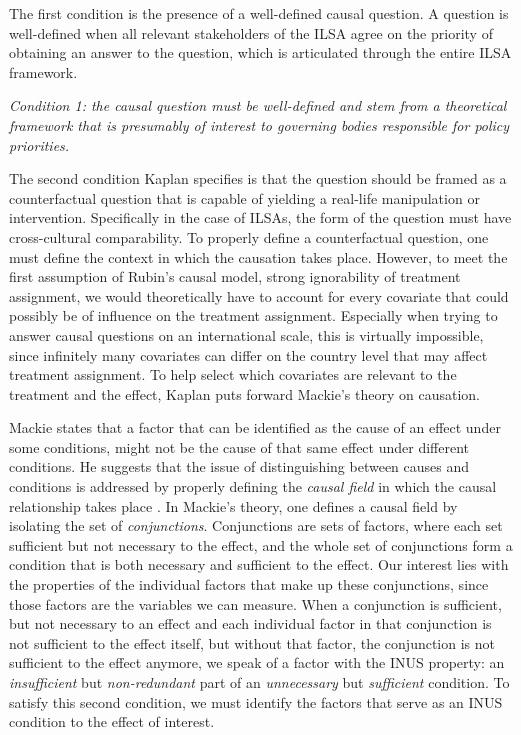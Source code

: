 The first condition is the presence of a well-defined causal question. A question is well-defined when all relevant stakeholders of the ILSA agree on the priority of obtaining an answer to the question, which is articulated through the entire ILSA framework.\newline

\textit{Condition 1: the causal question must be well-defined and stem from a theoretical framework that is presumably of interest to governing bodies responsible for policy priorities.}  \newline

The second condition Kaplan specifies is that the question should be framed as a counterfactual question that is capable of yielding a real-life manipulation or intervention. Specifically in the case of ILSAs, the form of the question must have cross-cultural comparability. To properly define a counterfactual question, one must define the context in which the causation takes place. However, to meet the first assumption of Rubin's causal model, strong ignorability of treatment assignment, we would theoretically have to account for every covariate that could possibly be of influence on the treatment assignment. Especially when trying to answer causal questions on an international scale, this is virtually impossible, since infinitely many covariates can differ on the country level that may affect treatment assignment. To help select which covariates are relevant to the treatment and the effect, Kaplan puts forward Mackie's theory on causation. \newline

Mackie states that a factor that can be identified as the cause of an effect under some conditions, might not be the cause of that same effect under different conditions. He suggests that the issue of distinguishing between causes and conditions is addressed by properly defining the \emph{causal field} in which the causal relationship takes place \parencite{mackie_cement_1974}. In Mackie's theory, one defines a causal field by isolating the set of \emph{conjunctions}. Conjunctions are sets of factors, where each set sufficient but not necessary to the effect, and the whole set of conjunctions form a condition that is both necessary and sufficient to the effect. Our interest lies with the properties of the individual factors that make up these conjunctions, since those factors are the variables we can measure. When a conjunction is sufficient, but not necessary to an effect and each individual factor in that conjunction is not sufficient to the effect itself, but without that factor, the conjunction is not sufficient to the effect anymore, we speak of a factor with the INUS property: an \emph{insufficient} but \emph{non-redundant} part of an \emph{unnecessary} but \emph{sufficient} condition. To satisfy this second condition, we must identify the factors that serve as an INUS condition to the effect of interest. \newline


